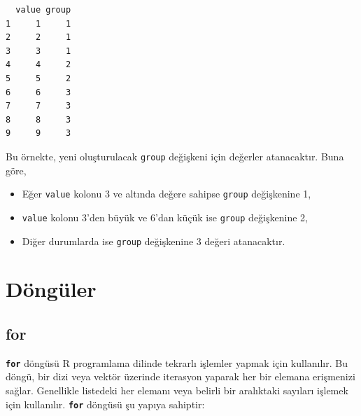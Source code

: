 \documentclass[
  letterpaper,
  DIV=11,
  numbers=noendperiod]{scrreprt}
\newenvironment{Shaded}{\begin{snugshade}}{\end{snugshade}}
\newcommand{\AttributeTok}[1]{\textcolor[rgb]{0.40,0.45,0.13}{#1}}
\newcommand{\DecValTok}[1]{\textcolor[rgb]{0.68,0.00,0.00}{#1}}
\newcommand{\FunctionTok}[1]{\textcolor[rgb]{0.28,0.35,0.67}{#1}}
\newcommand{\NormalTok}[1]{\textcolor[rgb]{0.00,0.23,0.31}{#1}}
\newcommand{\OtherTok}[1]{\textcolor[rgb]{0.00,0.23,0.31}{#1}}
\newcommand{\SpecialCharTok}[1]{\textcolor[rgb]{0.37,0.37,0.37}{#1}}
\begin{document}
\begin{Shaded}
\end{Shaded}

\begin{verbatim}
  value group
1     1     1
2     2     1
3     3     1
4     4     2
5     5     2
6     6     3
7     7     3
8     8     3
9     9     3
\end{verbatim}

Bu örnekte, yeni oluşturulacak \texttt{group} değişkeni için değerler
atanacaktır. Buna göre,

\begin{itemize}
\item
  Eğer \texttt{value} kolonu 3 ve altında değere sahipse \texttt{group}
  değişkenine 1,
\item
  \texttt{value} kolonu 3'den büyük ve 6'dan küçük ise \texttt{group}
  değişkenine 2,
\item
  Diğer durumlarda ise \texttt{group} değişkenine 3 değeri atanacaktır.
\end{itemize}

\section{Döngüler}\label{duxf6nguxfcler}

\subsection{for}\label{for}

\textbf{\texttt{for}} döngüsü R programlama dilinde tekrarlı işlemler
yapmak için kullanılır. Bu döngü, bir dizi veya vektör üzerinde
iterasyon yaparak her bir elemana erişmenizi sağlar. Genellikle
listedeki her elemanı veya belirli bir aralıktaki sayıları işlemek için
kullanılır. \textbf{\texttt{for}} döngüsü şu yapıya sahiptir:
\end{document}
